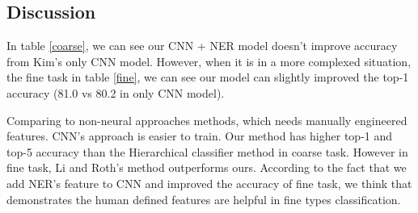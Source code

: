 \documentclass[10pt,twocolumn,letterpaper]{article}
\begin{document}
\begin{table}
\caption{Top-1 and top-5 accuracy for TREC coarse question types. }
\label{coarse}
\end{table}

\begin{table}

\caption{Top-1 and top-5 accuracy for TREC coarse question types.}
\label{fine}
\end{table}

\subsection{Discussion}
In table \ref{coarse}, we can see our CNN + NER model doesn't improve accuracy from Kim's only CNN model. However, when it is in a more complexed situation, the fine task in table \ref{fine}, we can see our model can slightly improved the top-1 accuracy (81.0 vs 80.2 in only CNN model). 

Comparing to non-neural approaches methods, which needs manually engineered features. CNN's approach is easier to train. Our method has higher top-1 and top-5 accuracy than the Hierarchical classifier method in coarse task. However in fine task, Li and Roth's method outperforms ours. According to the fact that we add NER's feature to CNN and improved the accuracy of fine task, we think that demonstrates the human defined features are helpful in fine types classification. 
\end{document}
